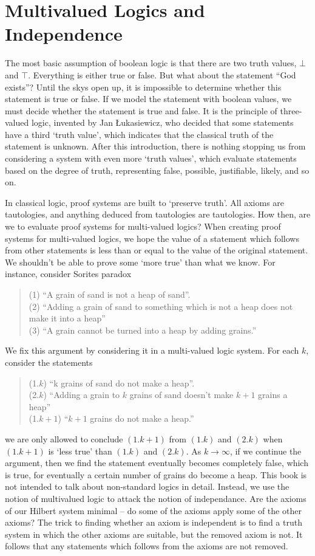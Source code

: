 \section{Multivalued Logics and Independence}

The most basic assumption of boolean logic is that there are two truth values, $\bot$ and $\top$. Everything is either true or false. But what about the statement ``God exists''? Until the skys open up, it is impossible to determine whether this statement is true or false. If we model the statement with boolean values, we must decide whether the statement is true and false. It is the principle of three-valued logic, invented by Jan \L ukasiewicz, who decided that some statements have a third `truth value', which indicates that the classical truth of the statement is unknown. After this introduction, there is nothing stopping us from considering a system with even more `truth values', which evaluate statements based on the degree of truth, representing false, possible, justifiable, likely, and so on.

In classical logic, proof systems are built to `preserve truth'. All axioms are tautologies, and anything deduced from tautologies are tautologies. How then, are we to evaluate proof systems for multi-valued logics? When creating proof systems for multi-valued logics, we hope the value of a statement which follows from other statements is less than or equal to the value of the original statement. We shouldn't be able to prove some `more true' than what we know. For instance, consider Sorites paradox
%
\begin{quote}
    (1) ``A grain of sand is not a heap of sand''.\\
    (2) ``Adding a grain of sand to something which is not a heap does not make it into a heap''\\
    (3) ``A grain cannot be turned into a heap by adding grains.''
\end{quote}
%
We fix this argument by considering it in a multi-valued logic system. For each $k$, consider the statements
%
\begin{quote}
    (1.$k$) ``k grains of sand do not make a heap''.\\
    (2.$k$) ``Adding a grain to $k$ grains of sand doesn't make $k+1$ grains a heap''\\
    (1.$k+1$) ``$k+1$ grains do not make a heap.''
\end{quote}
%
we are only allowed to conclude $(1.k+1)$ from $(1.k)$ and $(2.k)$ when $(1.k+1)$ is `less true' than $(1.k)$ and $(2.k)$. As $k \to \infty$, if we continue the argument, then we find the statement eventually becomes completely false, which is true, for eventually a certain number of grains do become a heap. This book is not intended to talk about non-standard logics in detail. Instead, we use the notion of multivalued logic to attack the notion of independance. Are the axioms of our Hilbert system minimal -- do some of the axioms apply some of the other axioms? The trick to finding whether an axiom is independent is to find a truth system in which the other axioms are suitable, but the removed axiom is not. It follows that any statements which follows from the axioms are not removed.


